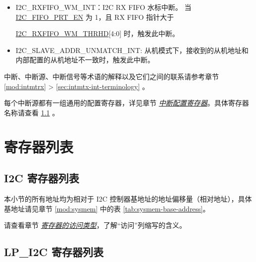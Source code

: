 \documentclass[main\_\_CN.tex]{subfiles}
\begin{document}
\begin{itemize}
\hyperref[fielddesc:I2CTXFIFOWMTHRHD]{I2C\_TXFIFO\_WM\_THRHD}[4:0] 时，触发此中断。
\item \label{int:i2c-rxfifo-wm}I2C\_RXFIFO\_WM\_INT：I2C RX FIFO 水标中断。 当\hyperref[fielddesc:I2CFIFOPRTEN]{I2C\_FIFO\_PRT\_EN} 为 1，且 RX FIFO 指针大于

\hyperref[fielddesc:I2CRXFIFOWMTHRHD]{I2C\_RXFIFO\_WM\_THRHD}[4:0] 时，触发此中断。
\item I2C\_SLAVE\_ADDR\_UNMATCH\_INT: 从机模式下，接收到的从机地址和内部配置的从机地址不一致时，触发此中断。
\end{itemize}

\begin{tiplisting}
中断、中断源、中断信号等术语的解释以及它们之间的联系请参考章节 \ref{mod:intmtrx} \textit{} > \ref{sec:intmtx-int-terminology} \textit{}。
\end{tiplisting}

每个中断源都有一组通用的配置寄存器，详见章节 \hyperref[interrupt-config-registers]{\textit{中断配置寄存器}}。具体寄存器名称请查看 \ref{sec:i2c-reg-summ} \textit{}。


\newpage
\section{寄存器列表}

\subsection{I2C 寄存器列表}
\label{sec:i2c-reg-summ}
\hypertarget{i2c-reg-summ}{}

本小节的所有地址均为相对于 I2C 控制器基地址的地址偏移量（相对地址），具体基地址请见章节 \ref{mod:sysmem} \textit{} 中的表 \ref{tab:sysmem-base-address}。

请查看章节 \hyperref[glossary-access-types]{\textit{寄存器的访问类型}}，了解“访问”列缩写的含义。



\subsection{LP\_I2C 寄存器列表}
\label{sec:lp-i2c-reg-summ}
\hypertarget{lp-i2c-reg-summ}{}
\end{document}
